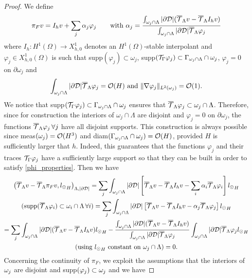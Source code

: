 \begin{proof}
We define
\begin{equation*}
\pi_F v = I_h v + \sum _j \alpha _j \varphi _j \qquad \text{with }\alpha_j =\frac{\int_{\omega _j \cap \Lambda}|\partial\mathcal{D}| ({\overline{\mathcal{T}}_\Lambda} v-{\overline{\mathcal{T}}_\Lambda} I_h v)}{\int_{\omega _j \cap \Lambda}|\partial\mathcal{D}|{\overline{\mathcal{T}}_\Lambda} \varphi _j}
\end{equation*}
where $I_h: H^1(\Omega) \rightarrow X_{h,0}^1$ denotes an $H^1(\Omega)$-stable interpolant
and $\varphi_j \in X_{h,0}^1(\Omega)$ is such that supp$(\varphi_j)\subset \omega_j$, supp$({\mathcal{T}_\Gamma} \varphi _j) \subset \Gamma_{\omega _j\cap \Lambda}\cap \omega_j$, $\varphi_j =0$ on $\partial \omega _j$ and 
\begin{equation}\label{phi_properties}
\int_{\patch\cap \Lambda}|\DD|\mtrace \varphi_j=\mathcal{O}(H) \text{ and } \|\nabla \varphi _j\|_{L^2(\omega _j)}=\mathcal{O}(1). 
\end{equation}
We notice that supp$({\mathcal{T}_\Gamma} \varphi_j) \subset \Gamma_{\omega _j\cap \Lambda}\cap \omega_j$ ensures that ${\overline{\mathcal{T}}_\Lambda} \varphi_j \subset \omega_j\cap \Lambda$. Therefore, since for construction the interiors of $\omega_j\cap \Lambda$  are disjoint and $\varphi _j = 0 $ on $\partial \omega_j$,  the functions ${\overline{\mathcal{T}}_\Lambda} \varphi_j\, \forall j$ have all disjoint supports. This construction is always possible since meas$(\omega _j) = \mathcal{O}(H^3)$ and diam$(\Gamma_{\omega _j\cap \Lambda} \cap \omega_j)=\mathcal{O}(H)$, provided $H$ is sufficiently larger that $h$. Indeed, this guarantees that the functions $\varphi _j$ and their traces ${\mathcal{T}_\Gamma} \varphi _j$ have a sufficiently large support so that they can be built in order to satisfy \eqref{phi_properties}.
Then we have
\begin{multline*}
\left({\overline{\mathcal{T}}_\Lambda} v - {\overline{\mathcal{T}}_\Lambda} \pi _F v  , {l_{\odot}}_H\right)_{\Lambda, |\partial\mathcal{D}|} = \sum _j \int_{\omega _j\cap \Lambda} |\partial\mathcal{D} |\left[ {\overline{\mathcal{T}}_\Lambda} v-{\overline{\mathcal{T}}_\Lambda} I_h v-\sum _i \alpha_i {\overline{\mathcal{T}}_\Lambda} \varphi _i \right]{l_{\odot}}_H \\
(\text{supp} ({\overline{\mathcal{T}}_\Lambda} \varphi _i )\subset \omega _i\cap \Lambda \, \forall i)  =\sum _j \int_{\omega _j\cap \Lambda}|\partial\mathcal{D}| \left[ {\overline{\mathcal{T}}_\Lambda} v-{\overline{\mathcal{T}}_\Lambda} I_h v-\alpha_j {\overline{\mathcal{T}}_\Lambda} \varphi _j \right]{l_{\odot}}_H\\
=\sum _j \int_{\omega _j\cap \Lambda} |\partial\mathcal{D}| ({\overline{\mathcal{T}}_\Lambda} v-{\overline{\mathcal{T}}_\Lambda}  I_h v) {l_{\odot}}_H - \frac{\int_{\omega _j\cap \Lambda} |\partial\mathcal{D}| ({\overline{\mathcal{T}}_\Lambda} v-{\overline{\mathcal{T}}_\Lambda} I_h v)}{\int_{\omega _j\cap \Lambda}|\partial\mathcal{D}|{\overline{\mathcal{T}}_\Lambda} \varphi _j} \int_{\omega _j\cap \Lambda} |\partial\mathcal{D}|{\overline{\mathcal{T}}_\Lambda} \varphi _j{l_{\odot}}_H\\ 
(\text{using ${l_{\odot}}_H$ constant on $\omega _j\cap \Lambda$})=0.
\end{multline*}
Concerning the continuity of $\pi_F$, we exploit the assumptions that the interiors of $\omega _j$ are disjoint and supp$(\varphi _j) \subset \omega _j$ and we have

\end{proof}
